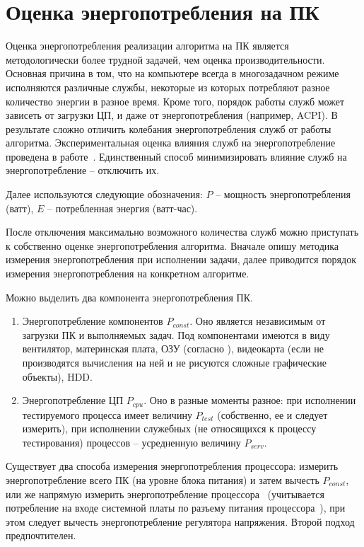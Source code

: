\section{Оценка энергопотребления на ПК} \label{ch3:sec3}

Оценка энергопотребления реализации алгоритма на ПК является методологически более трудной задачей, чем оценка производительности. Основная причина в том, что на компьютере всегда в многозадачном режиме исполняются различные службы, некоторые из которых потребляют разное количество энергии в разное время. Кроме того, порядок работы служб может зависеть от загрузки ЦП, и даже от энергопотребления (например, ACPI). В результате сложно отличить колебания энергопотребления служб от работы алгоритма. Экспериментальная оценка влияния служб на энергопотребление проведена в работе~\cite{src65}. Единственный способ минимизировать влияние служб на энергопотребление – отключить их.

Далее используются следующие обозначения: $P$ – мощность энергопотребления (ватт), $E$ – потребленная энергия (ватт-час).

После отключения максимально возможного количества служб можно приступать к собственно оценке энергопотребления алгоритма. Вначале опишу методика измерения энергопотребления при исполнении задачи, далее приводится порядок измерения энергопотребления на конкретном алгоритме.

Можно выделить два компонента энергопотребления ПК.
\begin{enumerate}
	\item Энергопотребление компонентов $P_{const}$.  Оно является независимым от загрузки ПК и выполняемых задач. Под компонентами имеются в виду вентилятор, материнская плата, ОЗУ (согласно  ), видеокарта (если не производятся вычисления на ней и не рисуются сложные графические объекты), HDD.
	\item Энергопотребление ЦП $P_{cpu}$. Оно в разные моменты разное: при исполнении тестируемого процесса имеет величину $P_{test}$ (собственно, ее и следует измерить), при исполнении служебных (не относящихся к процессу тестирования) процессов – усредненную величину $P_{serv}$.
\end{enumerate} 

Существует два способа измерения энергопотребления процессора: измерить энергопотребление всего ПК (на уровне блока питания) и затем вычесть $P_{const}$, или же напрямую измерить энергопотребление процессора~\cite{src66,src67} (учитывается потребление на входе системной платы по разъему питания процессора~\cite{src68}), при этом следует вычесть энергопотребление регулятора напряжения. Второй подход предпочтителен.

